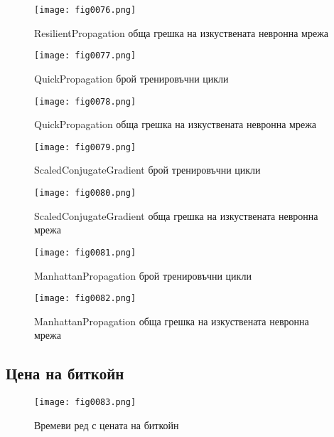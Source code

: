\begin{figure}[H]
  \centering
  \texttt{[image: fig0076.png]}
  \caption{ResilientPropagation обща грешка на изкуствената невронна мрежа}
\label{fig0076}
\end{figure}

\begin{figure}[H]
  \centering
  \texttt{[image: fig0077.png]}
  \caption{QuickPropagation брой тренировъчни цикли}
\label{fig0077}
\end{figure}

\begin{figure}[H]
  \centering
  \texttt{[image: fig0078.png]}
  \caption{QuickPropagation обща грешка на изкуствената невронна мрежа}
\label{fig0078}
\end{figure}

\begin{figure}[H]
  \centering
  \texttt{[image: fig0079.png]}
  \caption{ScaledConjugateGradient брой тренировъчни цикли}
\label{fig0079}
\end{figure}

\begin{figure}[H]
  \centering
  \texttt{[image: fig0080.png]}
  \caption{ScaledConjugateGradient обща грешка на изкуствената невронна мрежа}
\label{fig0080}
\end{figure}

\begin{figure}[H]
  \centering
  \texttt{[image: fig0081.png]}
  \caption{ManhattanPropagation брой тренировъчни цикли}
\label{fig0081}
\end{figure}

\begin{figure}[H]
  \centering
  \texttt{[image: fig0082.png]}
  \caption{ManhattanPropagation обща грешка на изкуствената невронна мрежа}
\label{fig0082}
\end{figure}

\subsection{Цена на биткойн}

\begin{figure}[H]
  \centering
  \texttt{[image: fig0083.png]}
  \caption{Времеви ред с цената на биткойн}
\label{fig0083}
\end{figure}

